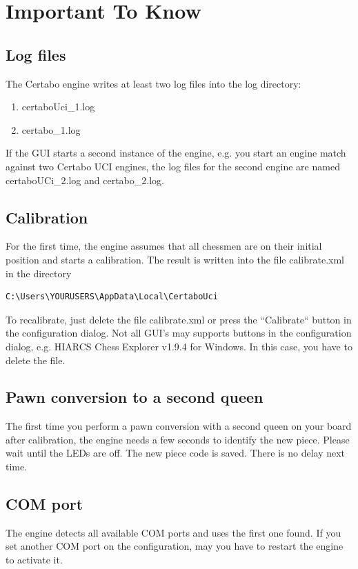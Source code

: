 \documentclass[11pt,a4paper]{article}
\begin{document}
\section{Important To Know}
\subsection{Log files}
The Certabo engine writes at least two log files into the log directory:
\begin{enumerate}
  \item certaboUci\_1.log
  \item certabo\_1.log
\end{enumerate}
If the GUI starts a second instance of the engine, e.g. you start an engine match against two Certabo UCI engines, the log files for the second engine are named certaboUCi\_2.log and certabo\_2.log.

\subsection{Calibration}
For the first time, the engine assumes that all chessmen are on their initial position and starts a calibration. The result is written into the file calibrate.xml in the directory \begin{verbatim}
C:\Users\YOURUSERS\AppData\Local\CertaboUci
\end{verbatim}

To recalibrate, just delete the file calibrate.xml or press the ``Calibrate`` button in the configuration dialog. Not all GUI's may supports buttons in the configuration dialog, e.g. HIARCS Chess Explorer v1.9.4 for Windows. In this case, you have to delete the file.

\subsection{Pawn conversion to a second queen}
The first time you perform a pawn conversion with a second queen on your board after calibration, the engine needs a few seconds to identify the new piece. Please wait until the LEDs are off.
The new piece code is saved. There is no delay next time.

\subsection{COM port}
The engine detects all available COM ports and uses the first one found. If you set another COM port on the configuration, may you have to restart the engine to activate it.
\end{document}
